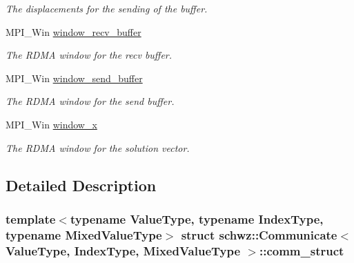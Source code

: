 \begin{DoxyCompactItemize}
\begin{DoxyCompactList}\small\item\em The displacements for the sending of the buffer. \end{DoxyCompactList}\item 
\mbox{\label{structschwz_1_1Communicate_1_1comm__struct_a6257c71a7ebf30ecfc390059ceef0e1f}} 
M\+P\+I\+\_\+\+Win \hyperlink{structschwz_1_1Communicate_1_1comm__struct_a6257c71a7ebf30ecfc390059ceef0e1f}{window\+\_\+recv\+\_\+buffer}
\begin{DoxyCompactList}\small\item\em The R\+D\+MA window for the recv buffer. \end{DoxyCompactList}\item 
\mbox{\label{structschwz_1_1Communicate_1_1comm__struct_af2c5d4bfea8073b2c885eec175b92416}} 
M\+P\+I\+\_\+\+Win \hyperlink{structschwz_1_1Communicate_1_1comm__struct_af2c5d4bfea8073b2c885eec175b92416}{window\+\_\+send\+\_\+buffer}
\begin{DoxyCompactList}\small\item\em The R\+D\+MA window for the send buffer. \end{DoxyCompactList}\item 
\mbox{\label{structschwz_1_1Communicate_1_1comm__struct_a5da0c24baf9d9955d764fe4b3274a982}} 
M\+P\+I\+\_\+\+Win \hyperlink{structschwz_1_1Communicate_1_1comm__struct_a5da0c24baf9d9955d764fe4b3274a982}{window\+\_\+x}
\begin{DoxyCompactList}\small\item\em The R\+D\+MA window for the solution vector. \end{DoxyCompactList}\end{DoxyCompactItemize}


\subsection{Detailed Description}
\subsubsection*{template$<$typename Value\+Type, typename Index\+Type, typename Mixed\+Value\+Type$>$\newline
struct schwz\+::\+Communicate$<$ Value\+Type, Index\+Type, Mixed\+Value\+Type $>$\+::comm\+\_\+struct}

